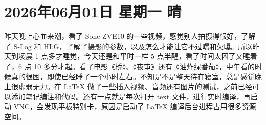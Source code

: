 \section*{2026年06月01日 \quad 星期一 \quad 晴}

昨天晚上心血来潮，看了 Sone ZVE10 的一些视频，感觉别人拍摄得很好，了解了 S-Log 和 HLG，了解了摄影的参数，以及怎么才能让它不过曝和欠曝。所以昨天到凌晨 1 点多才睡觉，今天还是和平时一样 5 点半醒，看了时间太困了又睡着了，6 点 10 多分才起。看了电影《桥》、《夜审》还有《油炸绿番茄》，中午看的时候真的很困，即使已经睡了一个小时左右。不知是不是整天待在寝室，总是感觉晚上很虚弱无力。在 LaTeX 做了一些插入视频、音频还有图片的测试，之前已经可以添加笔记编注和代码。还有一点就是每次打开 text 文件，进行实时编译，再启动 VNC，会发现平板特别卡，原因是启动了 LaTeX 编译后台进程占用很多资源空间。
